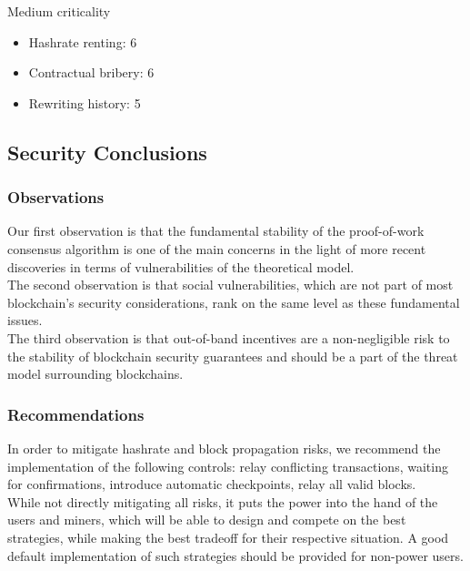 \documentclass[12pt,a4paper]{article}
\begin{document}
Medium criticality
\begin{itemize}
  \item Hashrate renting: 6
  \item Contractual bribery: 6
  \item Rewriting history: 5
\end{itemize}

\subsection{Security Conclusions}

\subsubsection{Observations}

Our first observation is that the fundamental stability of the proof-of-work consensus algorithm is one of the main concerns in the light of more recent discoveries in terms of vulnerabilities of the theoretical model.\\

The second observation is that social vulnerabilities, which are not part of most blockchain's security considerations, rank on the same level as these fundamental issues.\\

The third observation is that out-of-band incentives are a non-negligible risk to the stability of blockchain security guarantees and should be a part of the threat model surrounding \gls{blockchain}s.\\

\subsubsection{Recommendations}

In order to mitigate \gls{hashrate} and block propagation risks, we recommend the implementation of the following controls: relay conflicting transactions, waiting for confirmations, introduce automatic checkpoints, relay all valid blocks.\\

While not directly mitigating all risks, it puts the power into the hand of the users and miners, which will be able to design and compete on the best strategies, while making the best tradeoff for their respective situation. A good default implementation of such strategies should be provided for non-power users.\\
\end{document}
